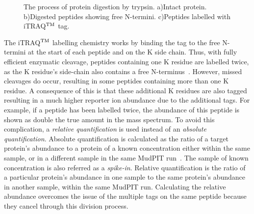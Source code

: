 \begin{figure}[htb]
\caption{The process of protein digestion by trypsin. a)Intact protein. b)Digested peptides showing free N-termini. c)Peptides labelled with iTRAQ$^{\rm TM}$ tag.}
\label{fig:protDigest}
\end{figure}

The iTRAQ$^{\rm TM}$ labelling chemistry works by binding the tag to the free N-termini at the start of each peptide and on the K side chain. Thus, with fully efficient enzymatic cleavage, peptides containing one K residue are labelled twice, as the K residue's side-chain also contains a free N-terminus~\citep{Wiese2006}. However, missed cleavages do occur, resulting in some peptides containing more than one K residue. A consequence of this is that these additional K residues are also tagged resulting in a much higher reporter ion abundance due to the additional tags. For example, if a peptide has been labelled twice, the abundance of this peptide is shown as double the true amount in the mass spectrum. To avoid this complication, a \emph{relative quantification} is used instead of an \emph{absolute quantification}. Absolute quantification is calculated as the ratio of a target protein's abundance to a protein of a known concentration either within the same sample, or in a different sample in the same MudPIT run~\citep{Thelen2007}. The sample of known concentration is also referred as a \emph{spike-in}. Relative quantification is the ratio of a particular protein's abundance in one sample to the same protein's abundance in another sample, within the same MudPIT run. Calculating the relative abundance overcomes the issue of the multiple tags on the same peptide because they cancel through this division process. 

